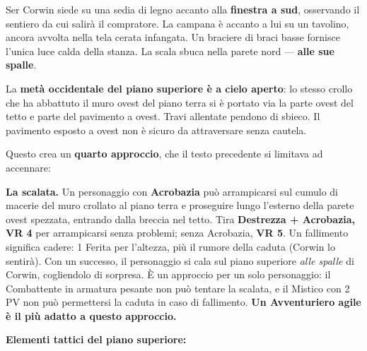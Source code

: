 \documentclass[10pt,a4paper]{article}
\begin{document}
Ser Corwin siede su una sedia di legno accanto alla \textbf{finestra a sud}, osservando il sentiero da cui salirà il compratore. La campana è accanto a lui su un tavolino, ancora avvolta nella tela cerata infangata. Un braciere di braci basse fornisce l'unica luce calda della stanza. La scala sbuca nella parete nord --- \textbf{alle sue spalle}.

La \textbf{metà occidentale del piano superiore è a cielo aperto}: lo stesso crollo che ha abbattuto il muro ovest del piano terra si è portato via la parte ovest del tetto e parte del pavimento a ovest. Travi allentate pendono di sbieco. Il pavimento esposto a ovest non è sicuro da attraversare senza cautela.

Questo crea un \textbf{quarto approccio}, che il testo precedente si limitava ad accennare:

\textbf{La scalata.} Un personaggio con \textbf{Acrobazia} può arrampicarsi sul cumulo di macerie del muro crollato al piano terra e proseguire lungo l'esterno della parete ovest spezzata, entrando dalla breccia nel tetto. Tira \textbf{Destrezza + Acrobazia, VR 4} per arrampicarsi senza problemi; senza Acrobazia, \textbf{VR 5}. Un fallimento significa cadere: 1 Ferita per l'altezza, più il rumore della caduta (Corwin lo sentirà). Con un successo, il personaggio si cala sul piano superiore \emph{alle spalle} di Corwin, cogliendolo di sorpresa. È un approccio per un solo personaggio: il Combattente in armatura pesante non può tentare la scalata, e il Mistico con 2 PV non può permettersi la caduta in caso di fallimento. \textbf{Un Avventuriero agile è il più adatto a questo approccio.}

\par{}\noindent\textbf{Elementi tattici del piano superiore:}
\end{document}
